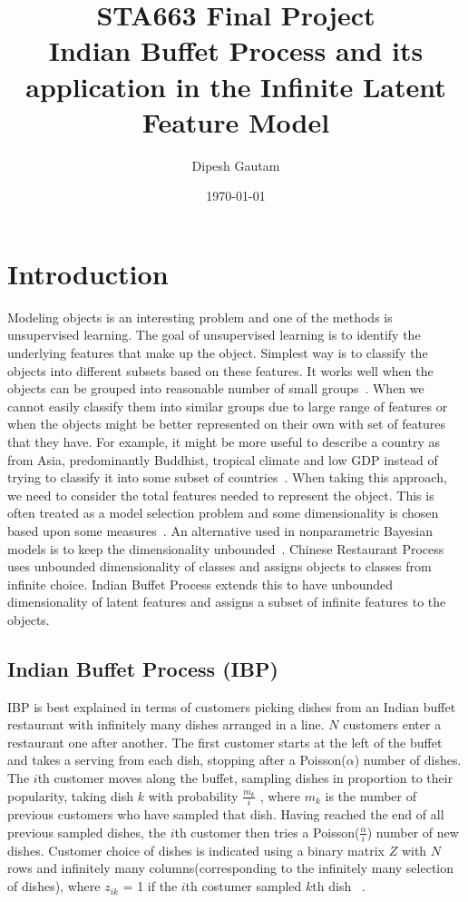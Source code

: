 \documentclass{article}
\begin{document}
\title{STA663 Final Project \\ Indian Buffet Process and its application in the Infinite Latent Feature Model}
\author{Dipesh Gautam}
\date{\today}
\maketitle



\section{Introduction}
Modeling objects is an interesting problem and one of the methods is unsupervised learning. The goal of unsupervised learning is to identify the underlying features that make up the object. Simplest way is to classify the objects into different subsets based on these features. It works well when the objects can be grouped into reasonable number of small groups~\cite{griffiths}. When we cannot easily classify them into similar groups due to large range of features or when the objects might be better represented on their own with set of features that they have. For example, it might be more useful to describe a country as from Asia, predominantly Buddhist, tropical climate and low GDP instead of trying to classify it into some subset of countries~\cite{griffiths1}. When taking this approach, we need to consider the total features needed to represent the object. This is often treated as a model selection problem and some dimensionality is chosen based upon some measures~\cite{griffiths}. An alternative used in nonparametric Bayesian models is to keep the dimensionality unbounded~\cite{occam}. Chinese Restaurant Process uses unbounded dimensionality of classes and assigns objects to classes from infinite choice. Indian Buffet Process extends this to have unbounded dimensionality of latent features and assigns a subset of infinite features to the objects.


\subsection{Indian Buffet Process (IBP)}
IBP is best explained in terms of customers picking dishes from an Indian buffet restaurant with infinitely many dishes arranged in a line. $N$ customers enter a restaurant one after another. The first customer starts at the left of the buffet and takes a serving from each dish, stopping after a Poisson($\alpha$) number of dishes. The $i$th customer moves along the buffet, sampling dishes in proportion to their popularity, taking dish $k$ with probability $\frac{m_k}{i}$ , where $m_k$ is the number of previous customers who have sampled that dish. Having reached the end of all previous sampled dishes, the $i$th customer then tries a Poisson($\frac{\alpha}{i}$) number of new dishes. Customer choice of dishes is indicated using a binary matrix $Z$ with $N$ rows and infinitely many columns(corresponding to the infinitely many selection of dishes), where $z_{ik}$ = 1 if the $i$th costumer sampled $k$th dish ~\cite{griffiths}.
\end{document}
